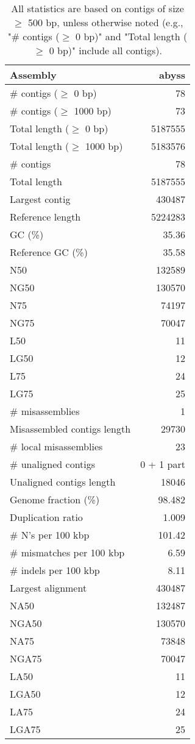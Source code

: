 \documentclass[12pt,a4paper]{article}
\begin{document}
\begin{table}[ht]
\begin{center}
\caption{All statistics are based on contigs of size $\geq$ 500 bp, unless otherwise noted (e.g., "\# contigs ($\geq$ 0 bp)" and "Total length ($\geq$ 0 bp)" include all contigs).}
\begin{tabular}{|l*{1}{|r}|}
\hline
Assembly & abyss \\ \hline
\# contigs ($\geq$ 0 bp) & 78 \\ \hline
\# contigs ($\geq$ 1000 bp) & 73 \\ \hline
Total length ($\geq$ 0 bp) & 5187555 \\ \hline
Total length ($\geq$ 1000 bp) & 5183576 \\ \hline
\# contigs & 78 \\ \hline
Total length & 5187555 \\ \hline
Largest contig & 430487 \\ \hline
Reference length & 5224283 \\ \hline
GC (\%) & 35.36 \\ \hline
Reference GC (\%) & 35.58 \\ \hline
N50 & 132589 \\ \hline
NG50 & 130570 \\ \hline
N75 & 74197 \\ \hline
NG75 & 70047 \\ \hline
L50 & 11 \\ \hline
LG50 & 12 \\ \hline
L75 & 24 \\ \hline
LG75 & 25 \\ \hline
\# misassemblies & 1 \\ \hline
Misassembled contigs length & 29730 \\ \hline
\# local misassemblies & 23 \\ \hline
\# unaligned contigs & 0 + 1 part \\ \hline
Unaligned contigs length & 18046 \\ \hline
Genome fraction (\%) & 98.482 \\ \hline
Duplication ratio & 1.009 \\ \hline
\# N's per 100 kbp & 101.42 \\ \hline
\# mismatches per 100 kbp & 6.59 \\ \hline
\# indels per 100 kbp & 8.11 \\ \hline
Largest alignment & 430487 \\ \hline
NA50 & 132487 \\ \hline
NGA50 & 130570 \\ \hline
NA75 & 73848 \\ \hline
NGA75 & 70047 \\ \hline
LA50 & 11 \\ \hline
LGA50 & 12 \\ \hline
LA75 & 24 \\ \hline
LGA75 & 25 \\ \hline
\end{tabular}
\end{center}
\end{table}
\end{document}
